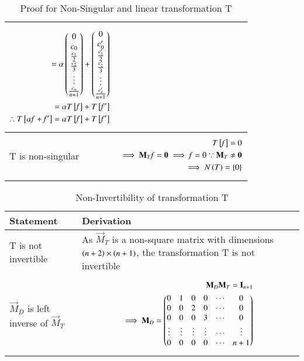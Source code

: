 \documentclass[journal,12pt,twocolumn]{IEEEtran}
\numberwithin{table}{section}
\begin{document}
\begin{table*}[ht!]
\begin{center}
\begin{tabular}{|l|l|}
{\begin{align}
=\alpha\begin{pmatrix}0\\c_0\\\frac{c_1}{2}\\\frac{c_2}{3}\\\vdots\\\frac{c_n}{n+1}\end{pmatrix}+\begin{pmatrix}0\\c_0^\prime\\\frac{c_1^\prime}{2}\\\frac{c_2^\prime}{3}\\\vdots\\\frac{c_n^\prime}{n+1}\end{pmatrix}\\
=\alpha T{}\left[\mathit{f}\right]+T{}\left[\mathit{f^\prime}\right]\\
\therefore T{}\left[\alpha\mathit{f}+\mathit{f^\prime}\right]=\alpha T{}\left[\mathit{f}\right]+T{}\left[\mathit{f^\prime}\right]
\end{align}}
\\ [0.5ex] 
\hline
T is non-singular & \parbox{10cm}{\begin{align}
T{}\left[\mathit{f}\right]=0\\
\implies \mathbf{M}_T\mathit{f}=\mathbf{0}
\implies \mathit{f}=0 \because \mathbf{M}_T \ne \mathbf{0}\\
\implies N\left(T\right)=\left\{0\right\}
\end{align}}
\\ [0.5ex] 
\hline
\end{tabular}
\caption{Proof for Non-Singular and linear transformation T}
\label{table:2}
\end{center}
\vspace{-0.5cm}
\end{table*}

\renewcommand{\thetable}{3}
\begin{table*}[ht!]
\begin{center}
\begin{tabular}{|p{4.7cm}|p{10cm}|}
\hline
\textbf{Statement} & \textbf{Derivation} \\[0.5ex]
\hline
T is not invertible & As $\vec{M}_T$ is a non-square matrix with dimensions $\left(n+2\right)\times\left(n+1\right)$, the transformation T is not invertible
\\ [0.5ex] 
\hline
$\vec{M}_D$ is left inverse of $\vec{M}_T$ 
& \parbox{10cm}{\begin{align}
\mathbf{M}_D\mathbf{M}_T=\mathbf{I}_{n+1}\\
\implies \mathbf{M}_D=\begin{pmatrix}0&1&0&0&\cdots&0\\0&0&2&0&\cdots&0\\0&0&0&3&\cdots&0\\\vdots&\vdots&\vdots&\vdots&\cdots&\vdots\\0&0&0&0&\cdots&n+1\end{pmatrix}
\end{align}}
\\ [0.5ex] 
\hline
\end{tabular}
\caption{Non-Invertibility of transformation T}
\label{table:3}
\end{center}
\vspace{-0.5cm}
\end{table*}
\end{document}

